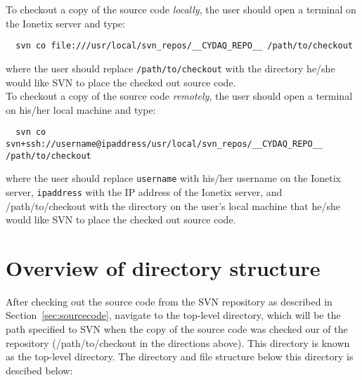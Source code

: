 \noindent
To checkout a copy of the \ADAQ source code \textit{locally}, the user
should open a terminal on the Ionetix server and type:
\begin{lstlisting}
  svn co file:///usr/local/svn_repos/__CYDAQ_REPO__ /path/to/checkout
\end{lstlisting}
where the user should replace \texttt{/path/to/checkout} with the
directory
he/she would like SVN to place the checked out \ADAQ source code.\\

\noindent
To checkout a copy of the \ADAQ source code \textit{remotely}, the user
should open a terminal on his/her local machine and type:
\begin{lstlisting}
  svn co svn+ssh://username@ipaddress/usr/local/svn_repos/__CYDAQ_REPO__ /path/to/checkout
\end{lstlisting}
where the user should replace \texttt{username} with his/her username
on the Ionetix server, \texttt{ipaddress} with the IP address of the
Ionetix server, and /path/to/checkout with the directory on the
user's local machine that he/she would like SVN to place the checked
out \ADAQ source code.

\section{Overview of \ADAQ directory structure}
\label{sec:directorystructure}
After checking out the \ADAQ source code from the SVN repository as
described in Section~\ref{sec:sourcecode}, navigate to the top-level
\ADAQ directory, which will be the path specified to SVN when the copy
of the source code was checked our of the repository
(/path/to/checkout in the directions above). This directory is known
as the top-level directory. The directory and file structure below
this directory is descibed below:

